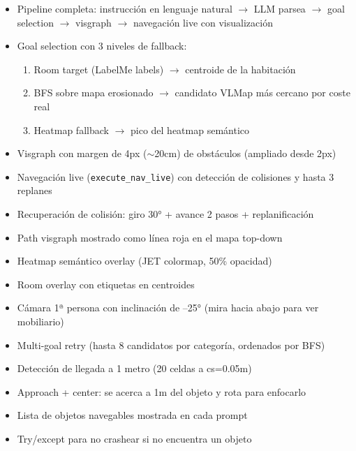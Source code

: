 \documentclass[11pt,a4paper]{article}
\begin{document}
\begin{itemize}[leftmargin=2cm]
    \item[\textcolor{done}{$\checkmark$}] Pipeline completa: instrucción en lenguaje natural $\rightarrow$ LLM parsea $\rightarrow$ goal selection $\rightarrow$ visgraph $\rightarrow$ navegación live con visualización
    \item[\textcolor{done}{$\checkmark$}] Goal selection con 3 niveles de fallback:
    \begin{enumerate}
        \item Room target (LabelMe labels) $\rightarrow$ centroide de la habitación
        \item BFS sobre mapa erosionado $\rightarrow$ candidato VLMap más cercano por coste real
        \item Heatmap fallback $\rightarrow$ pico del heatmap semántico
    \end{enumerate}
    \item[\textcolor{done}{$\checkmark$}] Visgraph con margen de 4px ($\sim$20cm) de obstáculos (ampliado desde 2px)
    \item[\textcolor{done}{$\checkmark$}] Navegación live (\texttt{execute\_nav\_live}) con detección de colisiones y hasta 3 replanes
    \item[\textcolor{done}{$\checkmark$}] Recuperación de colisión: giro 30° + avance 2 pasos + replanificación
    \item[\textcolor{done}{$\checkmark$}] Path visgraph mostrado como línea roja en el mapa top-down
    \item[\textcolor{done}{$\checkmark$}] Heatmap semántico overlay (JET colormap, 50\% opacidad)
    \item[\textcolor{done}{$\checkmark$}] Room overlay con etiquetas en centroides
    \item[\textcolor{done}{$\checkmark$}] Cámara 1ª persona con inclinación de --25° (mira hacia abajo para ver mobiliario)
    \item[\textcolor{done}{$\checkmark$}] Multi-goal retry (hasta 8 candidatos por categoría, ordenados por BFS)
    \item[\textcolor{done}{$\checkmark$}] Detección de llegada a 1 metro (20 celdas a cs=0.05m)
    \item[\textcolor{done}{$\checkmark$}] Approach + center: se acerca a 1m del objeto y rota para enfocarlo
    \item[\textcolor{done}{$\checkmark$}] Lista de objetos navegables mostrada en cada prompt
    \item[\textcolor{done}{$\checkmark$}] Try/except para no crashear si no encuentra un objeto
\end{itemize}
\end{document}
